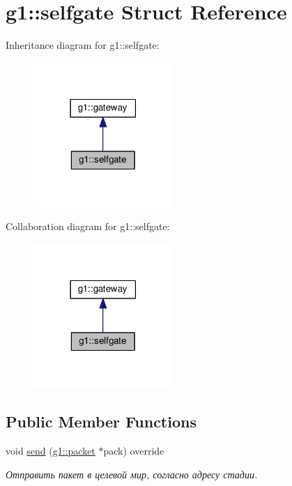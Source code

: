 \hypertarget{structg1_1_1selfgate}{}\section{g1\+:\+:selfgate Struct Reference}
\label{structg1_1_1selfgate}


Inheritance diagram for g1\+:\+:selfgate\+:
\nopagebreak
\begin{figure}[H]
\begin{center}
\leavevmode
\includegraphics[width=150pt]{structg1_1_1selfgate__inherit__graph}
\end{center}
\end{figure}


Collaboration diagram for g1\+:\+:selfgate\+:
\nopagebreak
\begin{figure}[H]
\begin{center}
\leavevmode
\includegraphics[width=150pt]{structg1_1_1selfgate__coll__graph}
\end{center}
\end{figure}
\subsection*{Public Member Functions}
\begin{DoxyCompactItemize}
\item 
void \hyperlink{structg1_1_1selfgate_ac833bf5a5ef33393e889e910d1762b2c}{send} (\hyperlink{structg1_1_1packet}{g1\+::packet} $\ast$pack) override
\begin{DoxyCompactList}\small\item\em Отправить пакет в целевой мир, согласно адресу стадии. \end{DoxyCompactList}\end{DoxyCompactItemize}
